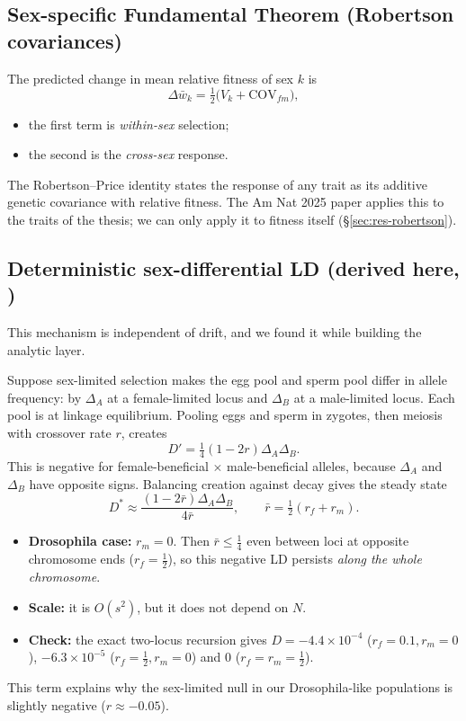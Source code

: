 \subsection{Sex-specific Fundamental Theorem (Robertson covariances)}
The predicted change in mean relative fitness of sex $k$ is
\begin{equation}
\Delta\bar w_k=\tfrac12\big(V_k+\mathrm{COV}_{fm}\big),
\end{equation}
\begin{itemize}
\item the first term is \emph{within-sex} selection;
\item the second is the \emph{cross-sex} response.
\end{itemize}
The Robertson--Price identity states the response of any trait as its additive genetic covariance with relative fitness. The Am Nat 2025 paper applies this to the traits of the thesis; we can only apply it to fitness itself (\S\ref{sec:res-robertson}).

\subsection{Deterministic sex-differential LD (derived here, \claimC)}\label{sec:sexdiffLD}
This mechanism is independent of drift, and we found it while building the analytic layer.

Suppose sex-limited selection makes the egg pool and sperm pool differ in allele frequency: by $\Delta_A$ at a female-limited locus and $\Delta_B$ at a male-limited locus. Each pool is at linkage equilibrium. Pooling eggs and sperm in zygotes, then meiosis with crossover rate $r$, creates
\begin{equation}
D'=\tfrac14(1-2r)\Delta_A\Delta_B.
\end{equation}
This is negative for female-beneficial $\times$ male-beneficial alleles, because $\Delta_A$ and $\Delta_B$ have opposite signs. Balancing creation against decay gives the steady state
\begin{equation}
D^*\approx\frac{(1-2\bar r)\Delta_A\Delta_B}{4\bar r},\qquad \bar r=\tfrac12(r_f+r_m).
\end{equation}
\begin{itemize}
\item \textbf{Drosophila case:} $r_m=0$. Then $\bar r\le\frac14$ even between loci at opposite chromosome ends ($r_f=\frac12$), so this negative LD persists \emph{along the whole chromosome}.
\item \textbf{Scale:} it is $O(s^2)$, but it does not depend on $N$.
\item \textbf{Check:} the exact two-locus recursion gives $D=-4.4\times10^{-4}$ ($r_f=0.1,r_m=0$), $-6.3\times10^{-5}$ ($r_f=\tfrac12,r_m=0$) and $0$ ($r_f=r_m=\tfrac12$).
\end{itemize}
This term explains why the sex-limited null in our Drosophila-like populations is slightly negative ($r\approx-0.05$).

